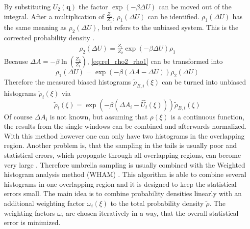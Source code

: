 By substituting $U_2(\mathbf{q})$ the factor $\exp\left(-\beta\Delta U\right)$ can be moved out of the integral. After a multiplication of $\frac{Z_1}{Z_1}$, $\rho_1(\Delta U)$ can be identified. $\rho_1(\Delta U)$ has the same meaning as $\rho_2(\Delta U)$, but refers to the unbiased system. This is the corrected probability density \autocite[p. 179ff]{UnderstandingMD}.
\begin{align}
\label{eq:rel_rho2_rho1}
\rho_2(\Delta U) = \frac{Z_1}{Z_2} \exp\left(-\beta\Delta U\right) \rho_1
\end{align}
Because $\Delta A = -\beta \ln\left(\frac{Z_2}{Z_1}\right)$, \autoref{eq:rel_rho2_rho1} can be transformed into
\begin{equation}
\rho_1(\Delta U) = \exp\left(-\beta\left(\Delta A - \Delta U\right)\right)\rho_2(\Delta U)
\end{equation}
Therefore the measured biased histograms $\tilde{\rho}_{B, i}(\xi)$ can be turned into unbiased histograms $\tilde{\rho}_{i}(\xi)$ via
\begin{equation}
\label{eq:reconstruction_from_biased}
\tilde{\rho}_{i}(\xi) = \exp\left(-\beta\left(\Delta A_i - \hat{U}_i(\xi)\right)\right)\tilde{\rho}_{B, i}(\xi)
\end{equation}
Of course $\Delta A_i$ is not known, but assuming that $\rho(\xi)$ is a continuous function, the results from the single windows can be combined and afterwards normalized. With this method however one can only have two histograms in the overlapping region. Another problem is, that the sampling in the tails is usually poor and statistical errors, which propagate through all overlapping regions, can become very large \autocite[236ff]{freeEnergyBook}. Therefore umbrella sampling is usually combined with the Weighted histogram analysis method (WHAM) \autocites{originalWHAM, extensionWHAM}. This algorithm is able to combine several histograms in one overlapping region and it is designed to keep the statistical errors small. The main idea is to combine probability densities linearly with an additional weighting factor $\omega_i(\xi)$ to the total probability density $\tilde{\rho}$. The weighting factors $\omega_i$ are chosen iteratively in a way, that the overall statistical error is minimized.\\ 